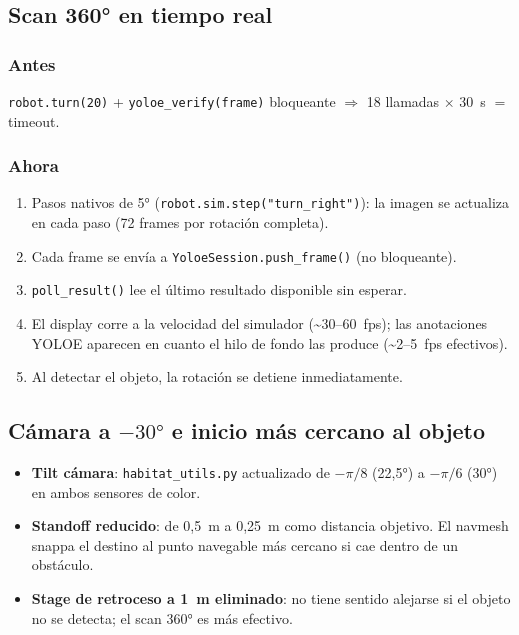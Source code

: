 \documentclass[11pt,a4paper]{article}
\begin{document}
\subsection{Scan 360° en tiempo real}

\subsubsection*{Antes}
\texttt{robot.turn(20)} + \texttt{yoloe\_verify(frame)} bloqueante $\Rightarrow$
18 llamadas $\times$ 30~s $=$ timeout.

\subsubsection*{Ahora}
\begin{enumerate}
  \item Pasos nativos de 5° (\texttt{robot.sim.step("turn\_right")}): la
        imagen se actualiza en cada paso (72 frames por rotación completa).
  \item Cada frame se envía a \texttt{YoloeSession.push\_frame()} (no bloqueante).
  \item \texttt{poll\_result()} lee el último resultado disponible sin esperar.
  \item El display corre a la velocidad del simulador (\textasciitilde30--60~fps);
        las anotaciones YOLOE aparecen en cuanto el hilo de fondo las produce
        (\textasciitilde2--5~fps efectivos).
  \item Al detectar el objeto, la rotación se detiene inmediatamente.
\end{enumerate}

\subsection{Cámara a $-30°$ e inicio más cercano al objeto}

\begin{itemize}
  \item \textbf{Tilt cámara}: \texttt{habitat\_utils.py} actualizado de
        $-\pi/8$ (22{,}5°) a $-\pi/6$ (30°) en ambos sensores de color.
  \item \textbf{Standoff reducido}: de 0{,}5~m a 0{,}25~m como distancia
        objetivo. El navmesh snappa el destino al punto navegable más cercano
        si cae dentro de un obstáculo.
  \item \textbf{Stage de retroceso a 1~m eliminado}: no tiene sentido alejarse
        si el objeto no se detecta; el scan 360° es más efectivo.
\end{itemize}
\end{document}
